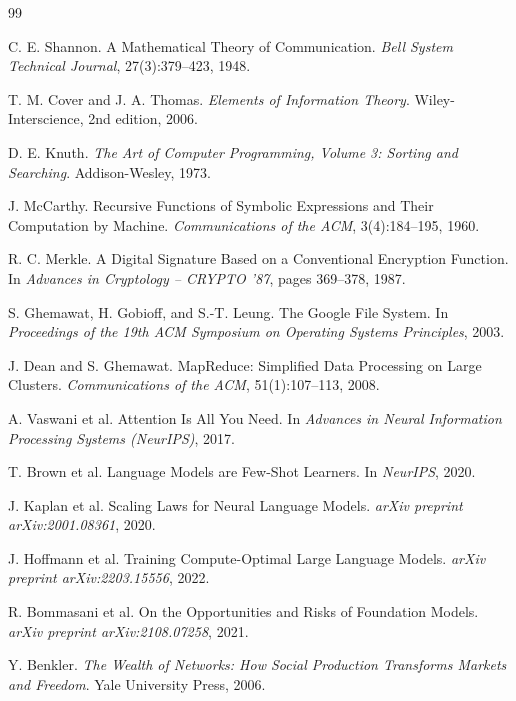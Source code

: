 \documentclass[12pt, oneside]{article}
\begin{document}
\newpage
\begin{thebibliography}{99}

C. E. Shannon.
\newblock A Mathematical Theory of Communication.
\newblock \emph{Bell System Technical Journal}, 27(3):379--423, 1948.

T. M. Cover and J. A. Thomas.
\newblock \emph{Elements of Information Theory}.
\newblock Wiley-Interscience, 2nd edition, 2006.

D. E. Knuth.
\newblock \emph{The Art of Computer Programming, Volume 3: Sorting and Searching}.
\newblock Addison-Wesley, 1973.

J. McCarthy.
\newblock Recursive Functions of Symbolic Expressions and Their Computation by Machine.
\newblock \emph{Communications of the ACM}, 3(4):184--195, 1960.

R. C. Merkle.
\newblock A Digital Signature Based on a Conventional Encryption Function.
\newblock In \emph{Advances in Cryptology -- CRYPTO '87}, pages 369--378, 1987.

S. Ghemawat, H. Gobioff, and S.-T. Leung.
\newblock The Google File System.
\newblock In \emph{Proceedings of the 19th ACM Symposium on Operating Systems Principles}, 2003.

J. Dean and S. Ghemawat.
\newblock MapReduce: Simplified Data Processing on Large Clusters.
\newblock \emph{Communications of the ACM}, 51(1):107--113, 2008.

A. Vaswani et al.
\newblock Attention Is All You Need.
\newblock In \emph{Advances in Neural Information Processing Systems (NeurIPS)}, 2017.

T. Brown et al.
\newblock Language Models are Few-Shot Learners.
\newblock In \emph{NeurIPS}, 2020.

J. Kaplan et al.
\newblock Scaling Laws for Neural Language Models.
\newblock \emph{arXiv preprint arXiv:2001.08361}, 2020.

J. Hoffmann et al.
\newblock Training Compute-Optimal Large Language Models.
\newblock \emph{arXiv preprint arXiv:2203.15556}, 2022.

R. Bommasani et al.
\newblock On the Opportunities and Risks of Foundation Models.
\newblock \emph{arXiv preprint arXiv:2108.07258}, 2021.

Y. Benkler.
\newblock \emph{The Wealth of Networks: How Social Production Transforms Markets and Freedom}.
\newblock Yale University Press, 2006.


\end{thebibliography}
\end{document}
